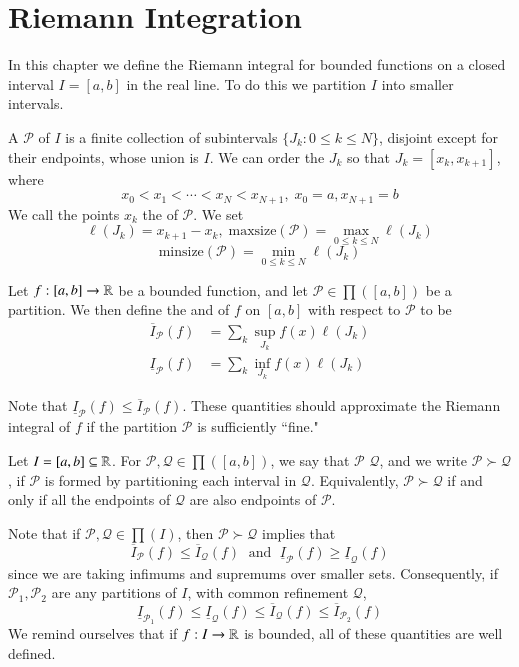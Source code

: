 \chapter{Riemann Integration}


In this chapter we define the Riemann integral for bounded functions on a closed interval $I = [a,b]$ in the real line. To do this we partition $I$ into smaller intervals.

\begin{defn}
    A  $\mathcal{P}$ of $I$ is a finite collection of subintervals $\{J_k:0 \leq k \leq N\}$, disjoint except for their endpoints, whose union is $I$. We can order the $J_k$ so that $J_k = [x_k,x_{k+1}]$, where $$x_0 < x_1 < \cdots < x_N < x_{N+1},\;x_0 = a, x_{N+1} = b$$
    We call the points $x_k$ the  of $\mathcal{P}$. We set $$\ell(J_k) = x_{k+1} - x_k,\;\text{maxsize}(\mathcal{P}) = \max_{0\leq k \leq N}\ell(J_k)$$ $$\text{minsize}(\mathcal{P}) = \min_{0\leq k \leq N}\ell(J_k)$$
\end{defn}

\begin{defn}
    Let $f:[a,b]\rightarrow \mathbb R$ be a bounded function, and let $\mathcal{P} \in \prod([a,b])$ be a partition. We then define the  and  of $f$ on $[a,b]$ with respect to $\mathcal{P}$ to be \begin{align*}
        \overline{I}_{\mathcal{P}}(f) &= \sum_k\sup_{J_k}f(x)\ell(J_k) \\
        \underline{I}_{\mathcal{P}}(f) &= \sum_k\inf_{J_k}f(x)\ell(J_k)
    \end{align*}
\end{defn}

Note that $\underline{I}_{\mathcal{P}}(f) \leq \overline{I}_{\mathcal{P}}(f)$. These quantities should approximate the Riemann integral of $f$ if the partition $\mathcal{P}$ is sufficiently ``fine."

\begin{defn}
    Let $I = [a,b] \subseteq \mathbb R$. For $\mathcal{P},\mathcal{Q} \in \prod([a,b])$, we say that $\mathcal{P}$  $\mathcal{Q}$, and we write $\mathcal{P}\succ \mathcal{Q}$, if $\mathcal{P}$ is formed by partitioning each interval in $\mathcal{Q}$. Equivalently, $\mathcal{P} \succ \mathcal{Q}$ if and only if all the endpoints of $\mathcal{Q}$ are also endpoints of $\mathcal{P}$.
\end{defn}

Note that if $\mathcal{P},\mathcal{Q} \in \prod(I)$, then $\mathcal{P}\succ\mathcal{Q}$ implies that $$\overline{I}_{\mathcal{P}}(f) \leq \overline{I}_{\mathcal{Q}}(f)\; \text{ and }\; \underline{I}_{\mathcal{P}}(f) \geq \underline{I}_{\mathcal{Q}}(f)$$
since we are taking infimums and supremums over smaller sets. Consequently, if $\mathcal{P}_1,\mathcal{P}_2$ are any partitions of $I$, with common refinement $\mathcal{Q}$, $$\underline{I}_{\mathcal{P}_1}(f) \leq \underline{I}_{\mathcal{Q}}(f) \leq \overline{I}_{\mathcal{Q}}(f) \leq \overline{I}_{\mathcal{P}_2}(f)$$
We remind ourselves that if $f:I\rightarrow \mathbb R$ is bounded, all of these quantities are well defined.

